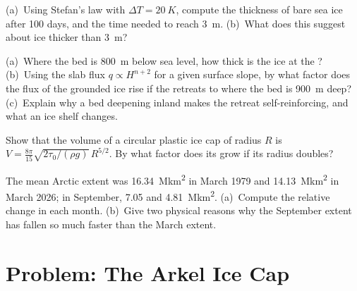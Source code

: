 \begin{exercise}[$\star\star$]\label{exo:b3:glaciology:9}
(a)~Using Stefan's law with $\Delta T = \qty{20}{K}$, compute the thickness
of bare sea ice after 100 days, and the time needed to reach \qty{3}{m}.
(b)~What does this suggest about ice thicker than \qty{3}{m}?
\end{exercise}

\begin{exercise}[$\star\star\star$]\label{exo:b3:glaciology:10}
(a)~Where the bed is \qty{800}{m} below sea level, how thick is the ice at
the ? (b)~Using the slab flux $q \propto H^{n+2}$ for a given
surface slope, by what factor does the flux of the grounded ice rise if the
 retreats to where the bed is \qty{900}{m} deep? (c)~Explain
why a bed deepening inland makes the retreat self-reinforcing, and what an
ice shelf changes.
\end{exercise}

\begin{exercise}[$\star\star\star$]\label{exo:b3:glaciology:11}
Show that the volume of a circular plastic ice cap of radius $R$ is $V =
\frac{8\pi}{15}\sqrt{2\tau_0/(\rho g)}\,R^{5/2}$. By what factor does its
 grow if its radius doubles?
\end{exercise}

\begin{exercise}[$\star\star\star$]\label{exo:b3:glaciology:12}
The mean Arctic extent was \qty{16.34}{\mega km^2} in March 1979 and
\qty{14.13}{\mega km^2} in March 2026; in September, \num{7.05} and
\qty{4.81}{\mega km^2}. (a)~Compute the relative change in each month.
(b)~Give two physical reasons why the September extent has fallen so much
faster than the March extent.
\end{exercise}

\section{Problem: The Arkel Ice Cap}

